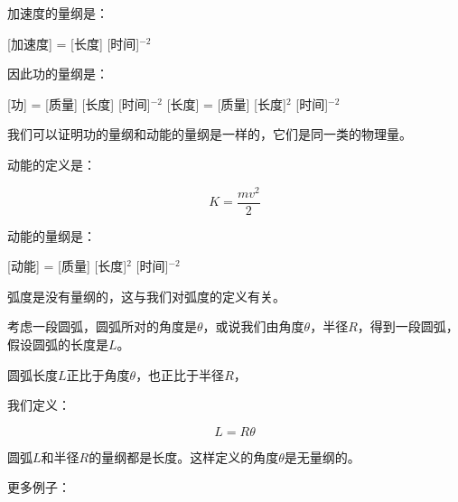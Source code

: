 加速度的量纲是：

\begin{center}
[加速度] = [长度] [时间]$^{-2}$
\end{center}

因此功的量纲是：

\begin{center}
[功] = [质量] [长度] [时间]$^{-2}$ [长度] = [质量] [长度]$^2$ [时间]$^{-2}$
\end{center}

我们可以证明功的量纲和动能的量纲是一样的，它们是同一类的物理量。

动能的定义是：

\begin{equation}
K = \frac{m v^2}{2}
\end{equation}

动能的量纲是：

\begin{center}
[动能] = [质量] [长度]$^2$ [时间]$^{-2}$
\end{center}

弧度是没有量纲的，这与我们对弧度的定义有关。

考虑一段圆弧，圆弧所对的角度是$\theta$，或说我们由角度$\theta$，半径$R$，得到一段圆弧，假设圆弧的长度是$L$。

圆弧长度$L$正比于角度$\theta$，也正比于半径$R$，

我们定义：

\begin{equation}
L = R \theta
\end{equation}

圆弧$L$和半径$R$的量纲都是长度。这样定义的角度$\theta$是无量纲的。

更多例子：

